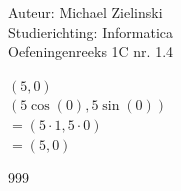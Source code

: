 \documentclass[a4paper]{article}
\begin{document}
  
\noindent \large Auteur: Michael Zielinski \\
\noindent \large Studierichting: Informatica\\
\noindent \large Oefeningenreeks 1C nr. 1.4\\

\medskip

\normalsize

$\left(5, 0\right)$\\

$\left(5 \cos\left(0\right), 5 \sin\left(0\right)\right)$\\

$=\left(5 \cdot 1, 5 \cdot 0\right)$\\

$=\left(5, 0\right)$

\begin{thebibliography}{999}
\end{thebibliography}
\end{document}
